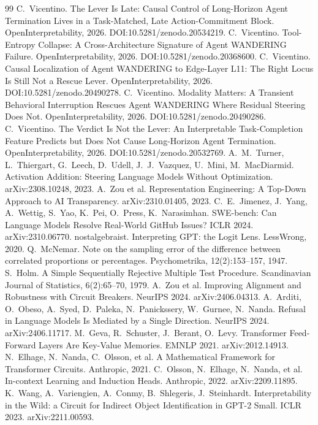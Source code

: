 \documentclass[11pt]{article}
\begin{document}
\begin{thebibliography}{99}
 C.~Vicentino. The Lever Is Late: Causal Control of Long-Horizon Agent Termination Lives in a Task-Matched, Late Action-Commitment Block. OpenInterpretability, 2026. DOI:10.5281/zenodo.20534219.
 C.~Vicentino. Tool-Entropy Collapse: A Cross-Architecture Signature of Agent WANDERING Failure. OpenInterpretability, 2026. DOI:10.5281/zenodo.20368600.
 C.~Vicentino. Causal Localization of Agent WANDERING to Edge-Layer L11: The Right Locus Is Still Not a Rescue Lever. OpenInterpretability, 2026. DOI:10.5281/zenodo.20490278.
 C.~Vicentino. Modality Matters: A Transient Behavioral Interruption Rescues Agent WANDERING Where Residual Steering Does Not. OpenInterpretability, 2026. DOI:10.5281/zenodo.20490286.
 C.~Vicentino. The Verdict Is Not the Lever: An Interpretable Task-Completion Feature Predicts but Does Not Cause Long-Horizon Agent Termination. OpenInterpretability, 2026. DOI:10.5281/zenodo.20532769.
 A.~M.~Turner, L.~Thiergart, G.~Leech, D.~Udell, J.~J.~Vazquez, U.~Mini, M.~MacDiarmid. Activation Addition: Steering Language Models Without Optimization. arXiv:2308.10248, 2023.
 A.~Zou et al. Representation Engineering: A Top-Down Approach to AI Transparency. arXiv:2310.01405, 2023.
 C.~E.~Jimenez, J.~Yang, A.~Wettig, S.~Yao, K.~Pei, O.~Press, K.~Narasimhan. SWE-bench: Can Language Models Resolve Real-World GitHub Issues? ICLR 2024. arXiv:2310.06770.
 nostalgebraist. Interpreting GPT: the Logit Lens. LessWrong, 2020.
 Q.~McNemar. Note on the sampling error of the difference between correlated proportions or percentages. Psychometrika, 12(2):153--157, 1947.
 S.~Holm. A Simple Sequentially Rejective Multiple Test Procedure. Scandinavian Journal of Statistics, 6(2):65--70, 1979.
 A.~Zou et al. Improving Alignment and Robustness with Circuit Breakers. NeurIPS 2024. arXiv:2406.04313.
 A.~Arditi, O.~Obeso, A.~Syed, D.~Paleka, N.~Panickssery, W.~Gurnee, N.~Nanda. Refusal in Language Models Is Mediated by a Single Direction. NeurIPS 2024. arXiv:2406.11717.
 M.~Geva, R.~Schuster, J.~Berant, O.~Levy. Transformer Feed-Forward Layers Are Key-Value Memories. EMNLP 2021. arXiv:2012.14913.
 N.~Elhage, N.~Nanda, C.~Olsson, et al. A Mathematical Framework for Transformer Circuits. Anthropic, 2021.
 C.~Olsson, N.~Elhage, N.~Nanda, et al. In-context Learning and Induction Heads. Anthropic, 2022. arXiv:2209.11895.
 K.~Wang, A.~Variengien, A.~Conmy, B.~Shlegeris, J.~Steinhardt. Interpretability in the Wild: a Circuit for Indirect Object Identification in GPT-2 Small. ICLR 2023. arXiv:2211.00593.
\end{thebibliography}
\end{document}
